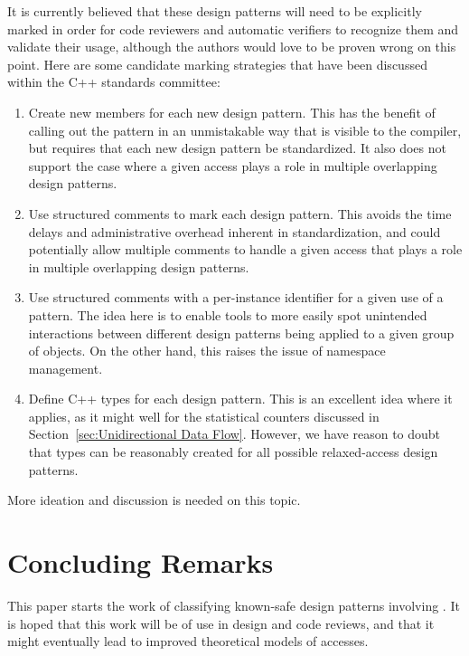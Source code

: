 \documentclass[10]{article}
\begin{document}
It is currently believed that these design patterns will need to be
explicitly marked in order for code reviewers and automatic verifiers
to recognize them and validate their usage, although the authors would
love to be proven wrong on this point.
Here are some candidate marking strategies that have been discussed
within the C++ standards committee:

\begin{enumerate}
\item	Create new   members for each new
	design pattern.
	This has the benefit of calling out the pattern in an unmistakable
	way that is visible to the compiler, but requires that each
	new design pattern be standardized.
	It also does not support the case where a given access plays a
	role in multiple overlapping design patterns.
\item	Use structured comments to mark each design pattern.
	This avoids the time delays and administrative overhead inherent
	in standardization, and could potentially allow multiple comments
	to handle a given access that plays a role in multiple overlapping
	design patterns.
\item	Use structured comments with a per-instance identifier for
	a given use of a pattern.
	The idea here is to enable tools to more easily spot
	unintended interactions between different design patterns
	being applied to a given group of objects.
	On the other hand, this raises the issue of namespace management.
\item	Define C++  types for each design pattern.
	This is an excellent idea where it applies, as it might well
	for the statistical counters discussed in
	Section~\ref{sec:Unidirectional Data Flow}.
	However, we have reason to doubt that  types can
	be reasonably created for all possible relaxed-access design
	patterns.
\end{enumerate}

More ideation and discussion is needed on this topic.

% 

\section{Concluding Remarks}
\label{sec:Concluding Remarks}

This paper starts the work of classifying known-safe design patterns
involving .
It is hoped that this work will be of use in design and code reviews,
and that it might eventually lead to improved theoretical models of
 accesses.




\end{document}
